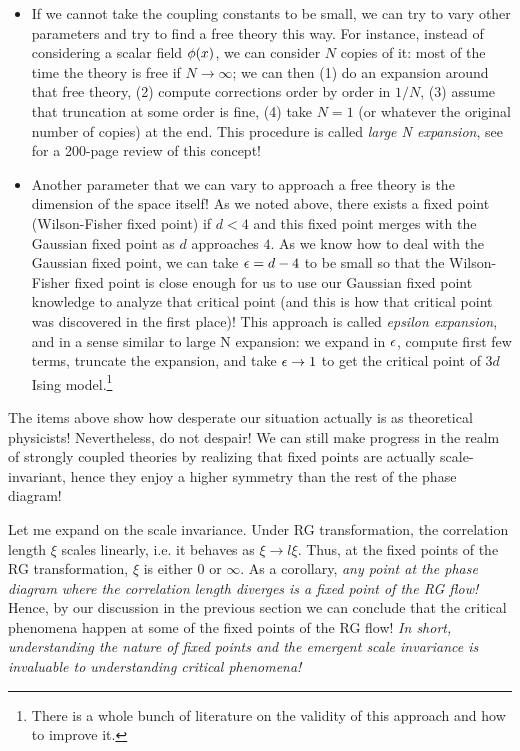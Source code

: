 \begin{itemize}
	\item If we cannot take the coupling constants to be small, we can try to vary other parameters and try to find a free theory this way. For instance, instead of considering a scalar field $\phi(x)$, we can consider $N$ copies of it: most of the time the theory is free if $N\rightarrow\infty$; we can then (1) do an expansion around that free theory, (2) compute corrections order by order in $1/N$, (3) assume that truncation at some order is fine, (4) take $N=1$ (or whatever the original number of copies) at the end. This procedure is called \emph{large N expansion}, see \cite{Moshe:2003xn} for a 200-page review of this concept!
	
	\item Another parameter that we can vary to approach a free theory is the dimension of the space itself! As we noted above, there exists a fixed point (Wilson-Fisher fixed point) if $d<4$ and this fixed point merges with the Gaussian fixed point as $d$ approaches $4$. As we know how to deal with the Gaussian fixed point, we can take $\epsilon=d-4$ to be small so that the Wilson-Fisher fixed point is close enough for us to use our Gaussian fixed point knowledge to analyze that critical point (and this is how that critical point was discovered in the first place)! This approach is called \emph{epsilon expansion}, and in a sense similar to large N expansion: we expand in $\epsilon$, compute first few terms, truncate the expansion, and take $\epsilon\rightarrow1$ to get the critical point of $3d$ Ising model.\footnote{There is a whole bunch of literature on the validity of this approach and how to improve it. }
\end{itemize}

The items above show how desperate our situation actually is as theoretical physicists! Nevertheless, do not despair! We can still make progress in the realm of strongly coupled theories by realizing that fixed points are actually scale-invariant, hence they enjoy a higher symmetry than the rest of the phase diagram!

Let me expand on the scale invariance. Under RG transformation, the correlation length $\xi$ scales linearly, i.e. it behaves as $\xi\rightarrow l \xi$. Thus, at the fixed points of the RG transformation, $\xi$ is either $0$ or $\infty$. As a corollary, \emph{any point at the phase diagram where the correlation length diverges is a fixed point of the RG flow!} Hence, by our discussion in the previous section we can conclude that the critical phenomena happen at some of the fixed points of the RG flow! \emph{ In short, understanding the nature of fixed points and the emergent scale invariance is invaluable to understanding critical phenomena!}


